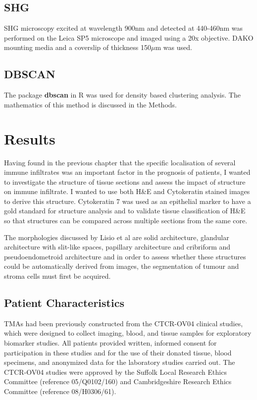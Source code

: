 \subsection{SHG}
SHG microscopy excited at wavelength 900nm and detected at 440-460nm was performed on the Leica SP5 microscope and imaged using a 20x objective. DAKO mounting media and a coverslip of thickness 150$\mu$m was used. 

\subsection{DBSCAN}
The package \textbf{dbscan} in R was used for density based clustering analysis. The mathematics of this method is discussed in the Methods. 

\section{Results}
Having found in the previous chapter that the specific localisation of several immune infiltrates was an important factor in the prognosis of patients, I wanted to investigate the structure of tissue sections and assess the impact of structure on immune infiltrate. I wanted to use both H\&E and Cytokeratin stained images to derive this structure. Cytokeratin 7 was used as an epithelial marker to have a gold standard for structure analysis and to validate tissue classification of H\&E so that structures can be compared across multiple sections from the same core.

The morphologies discussed by Lisio et al are solid architecture, glandular architecture with slit-like spaces, papillary architecture and cribriform and pseudoendometroid architecture\cite{Lisio2019Feb} and in order to assess whether these structures could be automatically derived from images, the segmentation of tumour and stroma cells must first be acquired. 

\subsection{Patient Characteristics}
TMAs had been previously constructed from the CTCR-OV04 clinical studies, which were designed to collect imaging, blood, and tissue samples for exploratory biomarker studies. All patients provided written, informed consent for participation in these studies and for the use of their donated tissue, blood specimens, and anonymized data for the laboratory studies carried out. The CTCR-OV04 studies were approved by the Suffolk Local Research Ethics Committee (reference 05/Q0102/160) and Cambridgeshire Research Ethics Committee (reference 08/H0306/61).\cite{}

